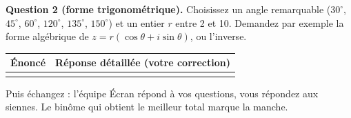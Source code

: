\documentclass[11pt,a4paper]{article}
\renewcommand{\arraystretch}{1.4}
\begin{document}
\textbf{Question 2 (forme trigonométrique).} Choisissez un angle remarquable
($30^{\circ}$, $45^{\circ}$, $60^{\circ}$, $120^{\circ}$, $135^{\circ}$,
$150^{\circ}$) et un entier $r$ entre 2 et 10. Demandez par exemple la forme
algébrique de $z = r(\cos\theta + i\sin\theta)$, ou l'inverse.

\begin{center}
\renewcommand{\arraystretch}{3.5}
\begin{tabularx}{\textwidth}{|X|X|}
  \hline
  \textbf{Énoncé} & \textbf{Réponse détaillée (votre correction)} \\ \hline
  & \\[2.2cm] \hline
\end{tabularx}
\end{center}

Puis échangez : l'équipe Écran répond à vos questions, vous répondez aux
siennes. Le binôme qui obtient le meilleur total marque la manche.
\end{document}
